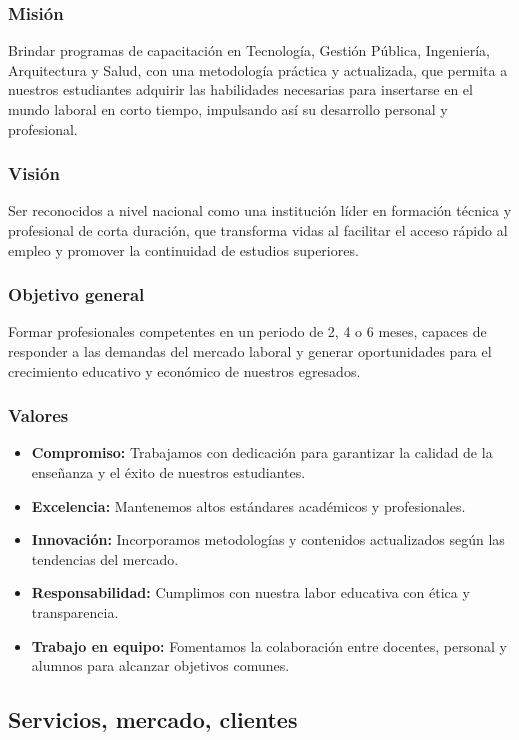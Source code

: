 \subsubsection{Misión}
Brindar programas de capacitación en Tecnología, Gestión Pública, Ingeniería, Arquitectura y Salud, con una metodología práctica y actualizada, que permita a nuestros estudiantes adquirir las habilidades necesarias para insertarse en el mundo laboral en corto tiempo, impulsando así su desarrollo personal y profesional.

\subsubsection{Visión}
Ser reconocidos a nivel nacional como una institución líder en formación técnica y profesional de corta duración, que transforma vidas al facilitar el acceso rápido al empleo y promover la continuidad de estudios superiores.

\subsubsection{Objetivo general}
Formar profesionales competentes en un periodo de 2, 4 o 6 meses, capaces de responder a las demandas del mercado laboral y generar oportunidades para el crecimiento educativo y económico de nuestros egresados.

\subsubsection{Valores}
\begin{itemize}
	\item \textbf{Compromiso:} Trabajamos con dedicación para garantizar la calidad de la enseñanza y el éxito de nuestros estudiantes.
	\item \textbf{Excelencia:} Mantenemos altos estándares académicos y profesionales.
	\item \textbf{Innovación:} Incorporamos metodologías y contenidos actualizados según las tendencias del mercado.
	\item \textbf{Responsabilidad:} Cumplimos con nuestra labor educativa con ética y transparencia.
	\item \textbf{Trabajo en equipo:} Fomentamos la colaboración entre docentes, personal y alumnos para alcanzar objetivos comunes.
\end{itemize}



\subsection{Servicios, mercado, clientes}
